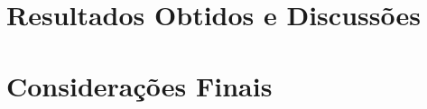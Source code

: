 \documentclass[
	12pt,				  %
	openright,		%
	a4paper,			%
	english,			%
	french,				%
	spanish,			%
	brazil,				%
]{abntex2}
\begin{document}
\chapter{Resultados Obtidos e Discussões}


\chapter{Considerações Finais}





\postextual





\begin{apendicesenv}

	\partapendices

\end{apendicesenv}



\begin{anexosenv}

\end{anexosenv}




\clearpage



\printindex

\printglossary
\printglossary[type=\acronymtype, title=Lista de Abreviações]
\end{document}
